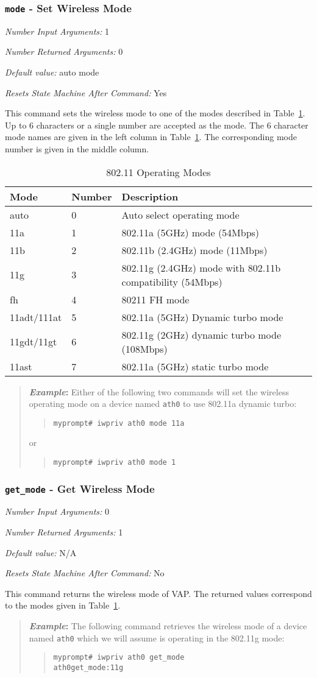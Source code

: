 \documentclass[10pt,fullpage]{article}
\newcommand{\mytt}[1]{{\texttt{#1}}}
\newcommand{\bv}{\begin{verse}}
\newcommand{\ev}{\end{verse}}
\newcommand{\cmd}[1]{{\texttt{myprompt\# #1}}}
\newcommand{\argdesc}[4]{\begin{description}
\itemsep -6pt
\item \textit{Number Input Arguments:} #1
\item \textit{Number Returned Arguments:} #2
\item \textit{Default value:} #3
\item \textit{Resets State Machine After Command:} #4
\end{description}
}
\newenvironment{example}{\begin{quote}\textbf{\textit{Example}:}}{\end{quote}}
\begin{document}
\subsubsection{\mytt{mode} - Set Wireless Mode}
\argdesc{1}{0}{auto mode}{Yes}
This command sets the wireless mode to one of the modes described in
Table~\ref{tab:mode}.  Up to 6 characters or a single number are
accepted as the mode.  The 6 character mode names are given in the
left column in Table~\ref{tab:mode}.  The corresponding mode number is
given in the middle column.
\begin{table}[h*]
  \centering
  \begin{tabular}{|l|l|l|} \hline
    Mode & Number & Description \\ \hline
    auto & 0 & Auto select operating mode \\
    11a & 1 & 802.11a (5GHz) mode (54Mbps) \\
    11b & 2 & 802.11b (2.4GHz) mode (11Mbps) \\
    11g & 3 & 802.11g (2.4GHz) mode with 802.11b compatibility
    (54Mbps) \\
    fh  & 4 & 80211 FH mode \\
    11adt/111at & 5 & 802.11a (5GHz) Dynamic turbo mode \\
    11gdt/11gt & 6 & 802.11g (2GHz) dynamic turbo mode (108Mbps) \\
    11ast & 7 & 802.11a (5GHz) static turbo mode \\ \hline
  \end{tabular}
  \caption{802.11 Operating Modes}
  \label{tab:mode}
\end{table}
\begin{example}
  Either of the following two commands will set the wireless operating
  mode on a device named \mytt{ath0} to use 802.11a dynamic turbo:
  \bv
  \cmd{iwpriv ath0 mode 11a}
  \ev
  or
  \bv
  \cmd{iwpriv ath0 mode 1}
  \ev
\end{example}

\subsubsection{\mytt{get\_mode} - Get Wireless Mode}
\argdesc{0}{1}{N/A}{No}
This command returns the wireless mode of VAP.  The returned values
correspond to the modes given in Table~\ref{tab:mode}.
\begin{example}
  The following command retrieves the wireless mode of a device named
  \mytt{ath0} which we will assume is operating in the 802.11g mode:
  \bv
  \cmd{iwpriv ath0 get\_mode}\\
  \mytt{ath0\hspace{32pt}get\_mode:11g}
  \ev
\end{example}
\end{document}
